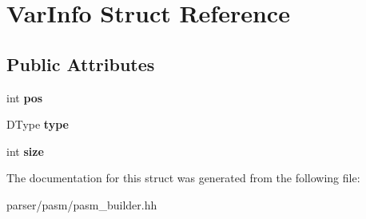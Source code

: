 \hypertarget{structVarInfo}{}\section{Var\+Info Struct Reference}
\label{structVarInfo}
\subsection*{Public Attributes}
\begin{DoxyCompactItemize}
\item 
\mbox{\label{structVarInfo_ae5828a2de331d4c58fda09c55951181d}} 
int {\bfseries pos}
\item 
\mbox{\label{structVarInfo_aa96c2b667ff13c0cb9df043402686507}} 
D\+Type {\bfseries type}
\item 
\mbox{\label{structVarInfo_abbce39dc1ebbf7080bd0f64685f3f685}} 
int {\bfseries size}
\end{DoxyCompactItemize}


The documentation for this struct was generated from the following file\+:\begin{DoxyCompactItemize}
\item 
parser/pasm/pasm\+\_\+builder.\+hh\end{DoxyCompactItemize}
